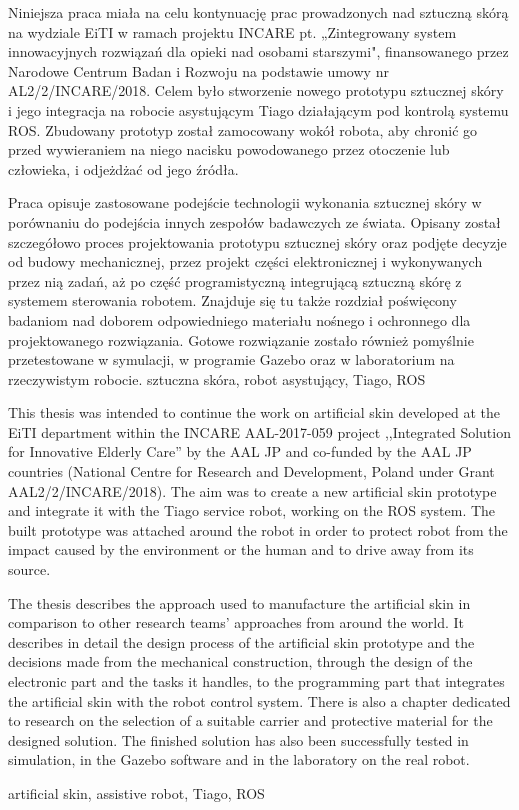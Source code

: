\streszczenie

Niniejsza praca miała na celu kontynuację prac prowadzonych nad sztuczną skórą na wydziale EiTI w ramach projektu INCARE pt. „Zintegrowany system innowacyjnych rozwiązań dla opieki nad osobami starszymi", finansowanego przez Narodowe Centrum Badan i Rozwoju na podstawie umowy nr AL2/2/INCARE/2018. Celem było stworzenie nowego prototypu sztucznej skóry i jego integracja na robocie asystującym Tiago działającym pod kontrolą systemu ROS. Zbudowany prototyp został zamocowany wokół robota, aby chronić go przed wywieraniem na niego nacisku powodowanego przez otoczenie lub człowieka, i odjeżdżać od jego źródła.

Praca opisuje zastosowane podejście technologii wykonania sztucznej skóry w porównaniu do podejścia innych zespołów badawczych ze świata. Opisany został szczegółowo proces projektowania prototypu sztucznej skóry oraz podjęte decyzje od budowy mechanicznej, przez projekt części elektronicznej i wykonywanych przez nią zadań, aż po część programistyczną integrującą sztuczną skórę z systemem sterowania robotem. Znajduje się tu także rozdział poświęcony badaniom nad doborem odpowiedniego materiału nośnego i ochronnego dla projektowanego rozwiązania. Gotowe rozwiązanie zostało również pomyślnie przetestowane w symulacji, w programie Gazebo oraz w laboratorium na rzeczywistym robocie.
\slowakluczowe sztuczna skóra, robot asystujący, Tiago, ROS

\newpage
\abstract

This thesis was intended to continue the work on artificial skin developed at the EiTI department within the INCARE AAL-2017-059 project ,,Integrated Solution for Innovative Elderly Care'' by the AAL JP and co-funded by the AAL JP countries (National Centre for Research and Development, Poland under Grant AAL2/2/INCARE/2018). The aim was to create a new artificial skin prototype and integrate it with the Tiago service robot, working on the ROS system. The built prototype was attached around the robot in order to protect robot from the impact caused by the environment or the human and to drive away from its source.

The thesis describes the approach used to manufacture the artificial skin in comparison to other research teams' approaches from around the world. It describes in detail the design process of the artificial skin prototype and the decisions made from the mechanical construction, through the design of the electronic part and the tasks it handles, to the programming part that integrates the artificial skin with the robot control system. There is also a chapter dedicated to research on the selection of a suitable carrier and protective material for the designed solution. The finished solution has also been successfully tested in simulation, in the Gazebo software and in the laboratory on the real robot.

\keywords artificial skin, assistive robot, Tiago, ROS
